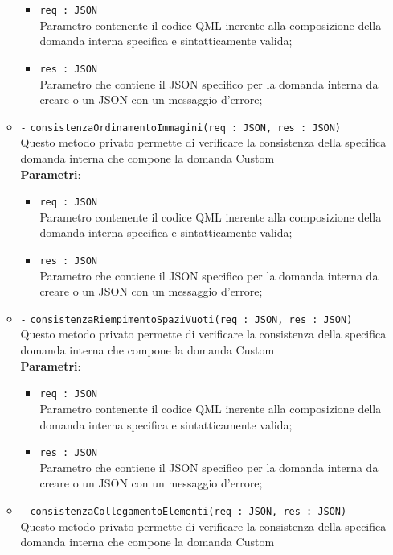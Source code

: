 \begin{itemize}
\begin{itemize}
\begin{itemize}
			\item \texttt{req : JSON} \\
			Parametro contenente il codice QML inerente alla composizione della domanda interna specifica e sintatticamente valida;
			\item \texttt{res : JSON} \\
			Parametro che contiene il JSON specifico per la domanda interna da creare o un JSON con un messaggio d'errore;
		\end{itemize}
		\item \texttt{-} \texttt{consistenzaOrdinamentoImmagini(req : JSON, res : JSON)} \\
		Questo metodo privato permette di verificare la consistenza della specifica domanda interna che compone la domanda Custom \\
		\textbf{Parametri}:
		\begin{itemize}
			\item \texttt{req : JSON} \\
			Parametro contenente il codice QML inerente alla composizione della domanda interna specifica e sintatticamente valida;
			\item \texttt{res : JSON} \\
			Parametro che contiene il JSON specifico per la domanda interna da creare o un JSON con un messaggio d'errore;
		\end{itemize}
		\item \texttt{-} \texttt{consistenzaRiempimentoSpaziVuoti(req : JSON, res : JSON)} \\
		Questo metodo privato permette di verificare la consistenza della specifica domanda interna che compone la domanda Custom \\
		\textbf{Parametri}:
		\begin{itemize}
			\item \texttt{req : JSON} \\
			Parametro contenente il codice QML inerente alla composizione della domanda interna specifica e sintatticamente valida;
			\item \texttt{res : JSON} \\
			Parametro che contiene il JSON specifico per la domanda interna da creare o un JSON con un messaggio d'errore;
		\end{itemize}
		\item \texttt{-} \texttt{consistenzaCollegamentoElementi(req : JSON, res : JSON)} \\
		Questo metodo privato permette di verificare la consistenza della specifica domanda interna che compone la domanda Custom \\

\end{itemize}
\end{itemize}

